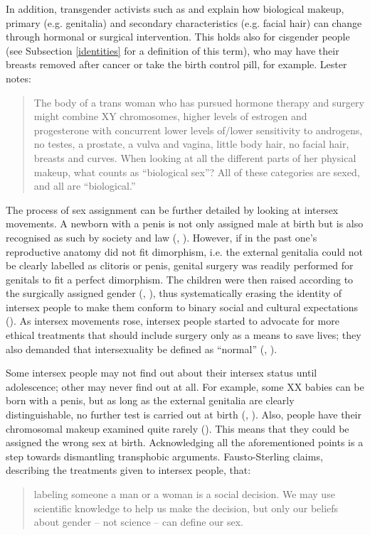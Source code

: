 In addition, transgender activists such as \textcite{serano2017transgender} and \textcite{lester2018trans} explain how biological makeup, primary (e.g. genitalia) and secondary characteristics (e.g. facial hair) can change through hormonal or surgical intervention. This holds also for cisgender people (see Subsection \ref{identities} for a definition of this term), who may have their breasts removed after cancer or take the birth control pill, for example. Lester notes:
\begin{quote}
    The body of a trans woman who has pursued hormone therapy and surgery might combine XY chromosomes, higher levels of estrogen and progesterone with concurrent lower levels of/lower sensitivity to androgens, no testes, a prostate, a vulva and vagina, little body hair, no facial hair, breasts and curves. When looking at all the different parts of her physical makeup, what counts as “biological sex”? All of these categories are sexed, and all are “biological.” \citep[60]{lester2018trans}
\end{quote}

The process of sex assignment can be further detailed by looking at intersex movements. A newborn with a penis is not only assigned male at birth but is also recognised as such by society and law (\cite{serano2017transgender}, \cite[56]{barker2019life}). However, if in the past one's reproductive anatomy did not fit dimorphism, i.e. the external genitalia could not be clearly labelled as clitoris or penis, genital surgery was readily performed for genitals to fit a perfect dimorphism. The children were then raised according to the surgically assigned gender (\cite[19--20]{fausto2000five}, \cite*{fausto2020sexing}), thus systematically erasing the identity of intersex people to make them conform to binary social and cultural expectations (\cite[57--58]{barker2019life}). As intersex movements rose, intersex people started to advocate for more ethical treatments that should include surgery only as a means to save lives; they also demanded that intersexuality be defined as ``normal'' (\cite[21]{fausto2000five}, \cite[57--58]{barker2019life}). 

Some intersex people may not find out about their intersex status until adolescence; other may never find out at all. For example, some XX babies can be born with a penis, but as long as the external genitalia are clearly distinguishable, no further test is carried out at birth (\cite{fausto2018why}, \cite[57]{barker2019life}). Also, people have their chromosomal makeup examined quite rarely (\cite{lester2018trans}). This means that they could be assigned the wrong sex at birth. Acknowledging all the aforementioned points is a step towards dismantling transphobic arguments. Fausto-Sterling claims, describing the treatments given to intersex people, that:
\begin{quote}
    labeling someone a man or a woman is a social decision. We may use scientific knowledge to help us make the decision, but only our beliefs about gender -- not science -- can define our sex. \citep[3]{sterling2020science}
\end{quote}

